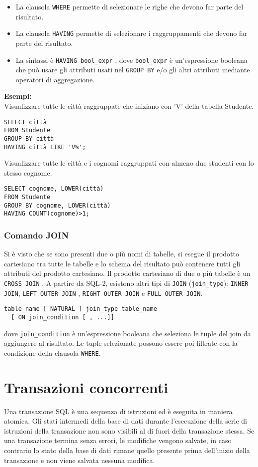 \documentclass[a4paper, 10pt]{article}
\begin{document}
		\begin{itemize}
			\item La clausola \lstinline|WHERE| permette di selezionare le righe che devono far parte
			del risultato.
			\item La clausola \lstinline|HAVING| permette di selezionare i raggruppamenti che
			devono far parte del risultato.
			\item La sintassi è \lstinline|HAVING bool_expr| , dove \lstinline|bool_expr| è un'espressione
			booleana che può usare gli attributi usati nel \lstinline|GROUP BY| e/o gli altri
			attributi mediante operatori di aggregazione.
		\end{itemize}
		\textbf{Esempi: }\\
		Visualizzare tutte le città raggruppate che iniziano con ’V’ della tabella
		Studente.
		\begin{lstlisting}
SELECT città
FROM Studente
GROUP BY città
HAVING città LIKE 'V%';
		\end{lstlisting}
		Visualizzare tutte le città e i cognomi raggruppati con almeno due studenti
		con lo stesso cognome.
		\begin{lstlisting}
SELECT cognome, LOWER(città)
FROM Studente
GROUP BY cognome, LOWER(città)
HAVING COUNT(cognome)>1;
		\end{lstlisting}
		
		\subsubsection{Comando JOIN}
			Si è visto che se sono presenti due o più nomi di tabelle, si esegue il
			prodotto cartesiano tra tutte le tabelle e lo schema del risultato può
			contenere tutti gli attributi del prodotto cartesiano.
			Il prodotto cartesiano di due o più tabelle è un \lstinline|CROSS JOIN| .
			A partire da SQL-2, esistono altri tipi di \lstinline|JOIN| (\lstinline|join_type|):
			\lstinline|INNER JOIN|, \lstinline|LEFT OUTER JOIN| , \lstinline|RIGHT OUTER JOIN| e \lstinline|FULL OUTER JOIN|.
			
			\begin{lstlisting}
table_name [ NATURAL ] join_type table_name 
  [ ON join_condition [ , ...]]
			\end{lstlisting}
			dove \lstinline|join_condition| è un’espressione booleana che seleziona le tuple del join
			da aggiungere al risultato. Le tuple selezionate possono essere poi filtrate
			con la condizione della clausola \lstinline|WHERE|.
		
	\section{Transazioni concorrenti}
	Una transazione SQL è una sequenza di istruzioni ed è eseguita in maniera atomica.
	Gli stati intermedi della base di dati durante l'esecuzione della serie di istruzioni della transazione non sono visibili al di fuori della transazione stessa.
	Se una transazione termina senza errori, le modifiche vengono salvate, in caso contrario lo stato della base di dati rimane quello presente prima dell'inizio della transazione e non viene salvata nessuna modifica.
	
\end{document}
